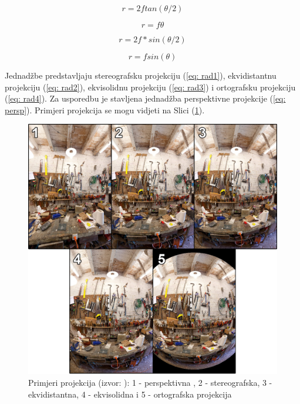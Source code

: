 \documentclass[../seminar.tex]{subfiles}
\begin{document}
\begin{equation}
\label{eq: rad1}
r = 2 f tan(\theta / 2)
\end{equation}

\begin{equation}
\label{eq: rad2}
r = f \theta
\end{equation}

\begin{equation}
\label{eq: rad3}
r = 2f * sin(\theta / 2)
\end{equation}

\begin{equation}
\label{eq: rad4}
r = f sin(\theta)
\end{equation}

Jednadžbe predstavljaju stereografsku projekciju (\ref{eq: rad1}), ekvidistantnu projekciju (\ref{eq: rad2}), ekvisolidnu projekciju (\ref{eq: rad3}) i ortografsku projekciju (\ref{eq: rad4}). Za usporedbu je stavljena jednadžba perspektivne projekcije (\ref{eq: persp}). Primjeri projekcija se mogu vidjeti na Slici (\ref{fig:projekcijski_modeli}).

\begin{figure}[ht!]
  \centering
    \includegraphics[width=.9\textwidth]{projection_models_examples.png}
   \caption{Primjeri projekcija (izvor: \cite{MichelThoby:Fisheye}): 1 - perspektivna , 2 - stereografska, 3 - ekvidistantna, 4 - ekvisolidna i 5 - ortografska projekcija}
  \label{fig:projekcijski_modeli}
\end{figure}
\end{document}
